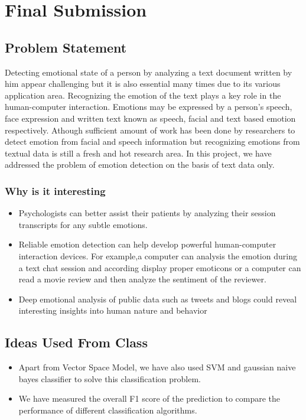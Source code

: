 \chapter{Final Submission}
\section{Problem Statement}
\label{prob-stmt}
Detecting emotional state of a person by analyzing a text document
written by him appear challenging but it is also essential many times due to its various application area. Recognizing the emotion of the text plays a key role in 
the human-computer interaction. Emotions may be expressed by a person's speech, 
face  expression  and  written  text  known  as  speech,  facial  and  text  based  emotion 
respectively. Athough sufficient amount of work has been done by researchers to detect emotion from facial and 
speech information but recognizing  emotions  from  textual  data  is still a fresh and hot 
research area. In this project, we have addressed the problem of emotion detection on the basis of text data only.
\subsection{Why is it interesting}
\begin{itemize}
\item Psychologists can better assist their patients by analyzing their session transcripts for any subtle emotions.
\item Reliable emotion detection can help develop powerful human-computer interaction devices. For example,a computer can analysis the emotion during a text chat session and according display proper emoticons or a computer can read a movie review and then analyze the sentiment of the reviewer.
\item Deep  emotional  analysis  of  public  data such  as  tweets  and  blogs  could  reveal  interesting  insights into human nature and behavior
\end{itemize}
\section{Ideas Used From Class}
\label{ideas-from-class}
\begin{itemize}
    \item Apart from Vector Space Model, we have also used SVM and gaussian naive bayes classifier to solve this classification problem.
    \item We have measured the overall F1 score of the prediction to compare the
        performance of different classification algorithms.
\end{itemize}


